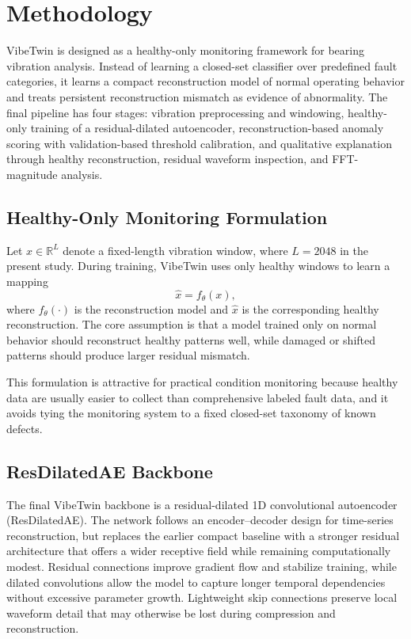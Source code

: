 \section{Methodology}

VibeTwin is designed as a healthy-only monitoring framework for bearing vibration analysis. Instead of learning a closed-set classifier over predefined fault categories, it learns a compact reconstruction model of normal operating behavior and treats persistent reconstruction mismatch as evidence of abnormality. The final pipeline has four stages: vibration preprocessing and windowing, healthy-only training of a residual-dilated autoencoder, reconstruction-based anomaly scoring with validation-based threshold calibration, and qualitative explanation through healthy reconstruction, residual waveform inspection, and FFT-magnitude analysis.

\subsection{Healthy-Only Monitoring Formulation}

Let $x \in \mathbb{R}^{L}$ denote a fixed-length vibration window, where $L=2048$ in the present study. During training, VibeTwin uses only healthy windows to learn a mapping
\begin{equation}
\hat{x} = f_{\theta}(x),
\end{equation}
where $f_{\theta}(\cdot)$ is the reconstruction model and $\hat{x}$ is the corresponding healthy reconstruction. The core assumption is that a model trained only on normal behavior should reconstruct healthy patterns well, while damaged or shifted patterns should produce larger residual mismatch.

This formulation is attractive for practical condition monitoring because healthy data are usually easier to collect than comprehensive labeled fault data, and it avoids tying the monitoring system to a fixed closed-set taxonomy of known defects.

\subsection{ResDilatedAE Backbone}

The final VibeTwin backbone is a residual-dilated 1D convolutional autoencoder (ResDilatedAE). The network follows an encoder--decoder design for time-series reconstruction, but replaces the earlier compact baseline with a stronger residual architecture that offers a wider receptive field while remaining computationally modest. Residual connections improve gradient flow and stabilize training, while dilated convolutions allow the model to capture longer temporal dependencies without excessive parameter growth. Lightweight skip connections preserve local waveform detail that may otherwise be lost during compression and reconstruction.

